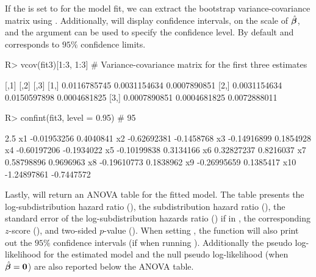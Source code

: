 If the  is set to  for the  model fit, we can extract the bootstrap variance-covariance matrix using . Additionally,  will display confidence intervals, on the scale of $\hat{\bm \beta}$, and the  argument can be used to specify the confidence level. By default  and corresponds to $95\%$ confidence limits. 
\begin{example}
R> vcov(fit3)[1:3, 1:3] # Variance-covariance matrix for the first three estimates

             [,1]         [,2]         [,3]
[1,] 0.0116785745 0.0031154634 0.0007890851
[2,] 0.0031154634 0.0150597898 0.0004681825
[3,] 0.0007890851 0.0004681825 0.0072888011


R> confint(fit3, level = 0.95) # 95 %

           2.5%
x1  -0.01953256  0.4040841
x2  -0.62692381 -0.1458768
x3  -0.14916899  0.1854928
x4  -0.60197206 -0.1934022
x5  -0.10199838  0.3134166
x6   0.32827237  0.8216037
x7   0.58798896  0.9696963
x8  -0.19610773  0.1838962
x9  -0.26995659  0.1385417
x10 -1.24897861 -0.7447572
\end{example}

Lastly,  will return an ANOVA table for the fitted model. The table presents the log-subdistribution hazard ratio (), the subdistribution hazard ratio (), the standard error of the log-subdistribution hazards ratio () if  in , the corresponding $z$-score (), and two-sided $p$-value (). When setting , the  function will also print out the $95\%$ confidence intervals (if  when running ). Additionally the pseudo log-likelihood for the estimated model and the null pseudo log-likelihood (when $\hat{\bm \beta} = \mathbf{0}$) are also reported below the ANOVA table.

